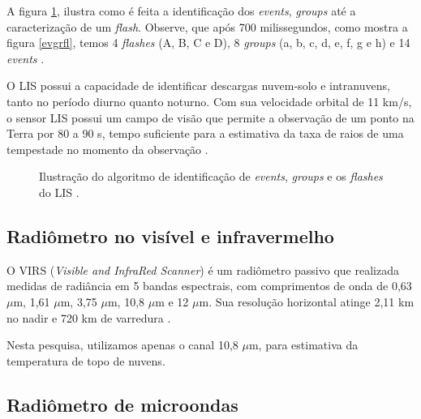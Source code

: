 A figura \ref{LisImagemProcessa}, ilustra como é feita a identificação dos  \textit{events}, \textit{groups} até a caracterização de um \textit{flash}. Observe, que após 700 milissegundos, como mostra a figura \ref{evgrfl}, temos 4 \textit{flashes} (A, B, C e D),  8 \textit{groups} (a, b, c, d, e, f, g e h) e 14 \textit{events} \cite{christian2000LISalgorithm,trmmhandbook}.


O LIS possui a capacidade de identificar descargas nuvem-solo e intranuvens, tanto no período diurno quanto noturno.  Com sua velocidade orbital de 11 km/s, o sensor LIS possui um campo de visão que permite a observação de um ponto na Terra por 80 a 90 s, tempo suficiente para a estimativa da taxa de raios de uma tempestade no momento da observação \cite{christianTM,trmmhandbook}.


\begin{figure}[!ht]
\caption{Ilustração do algoritmo de identificação de \textit{events}, \textit{groups} e os \textit{flashes}  do LIS \cite{christian2000LISalgorithm}.}
\label{LisImagemProcessa} 
\end{figure} 



\subsection{Radiômetro no visível e infravermelho}

O VIRS (\textit{Visible and InfraRed Scanner}) é um radiômetro passivo que realizada medidas de radiância em 5 bandas espectrais, com comprimentos de onda de 0,63 $\mu$m, 1,61 $\mu$m, 3,75 $\mu$m, 10,8 $\mu$m e 12 $\mu$m. Sua resolução horizontal atinge 2,11 km no nadir e 720 km de varredura \cite{trmmhandbook}.

Nesta pesquisa, utilizamos apenas o canal  10,8 $\mu$m, para estimativa da temperatura de topo de nuvens.

\subsection{Radiômetro de microondas}

